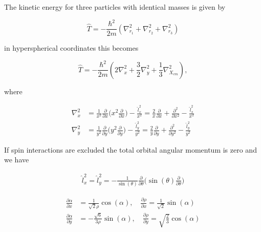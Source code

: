 \documentclass{article}
\begin{document}
The kinetic energy for three particles with identical masses is given by

\begin{equation}
\hat{T} = -\frac{\hbar^2}{2m}( \nabla^{2}_{r_1} + \nabla^{2}_{r_2} + \nabla^{2}_{r_3} )
\end{equation}

in hyperspherical coordinates this becomes 

\begin{equation}
\hat{T} = -\frac{\hbar^2}{2m}( 2\nabla^{2}_{x} + \frac{3}{2}\nabla^{2}_{y} + \frac{1}{3}\nabla^{2}_{X_{cm}} ),
\end{equation}

where

\begin{subequations}
\begin{align}
	\nabla^2_{x} &= \frac{1}{x^2}\frac{\partial}{\partial x} \Big( x^2 \frac{\partial}{\partial x} \Big) - \frac{\hat{l}^2_{x}}{x^2} = \frac{2}{x}\frac{\partial}{\partial x} + \frac{\partial^2}{\partial x^{2}} - \frac{\hat{l}^{2}_{x}}{x^2}\\
	\nabla^2_{y} &= \frac{1}{y^2}\frac{\partial}{\partial y} \Big( y^2 \frac{\partial}{\partial y} \Big) - \frac{\hat{l}^2_{y}}{y^2} = \frac{2}{y}\frac{\partial}{\partial y} + \frac{\partial^2}{\partial y^{2}} - \frac{\hat{l}^{2}_{y}}{y^2}
\end{align}
\end{subequations}

If spin interactions are excluded the total orbital angular momentum is zero and we have 

\begin{subequations}
\begin{align}
\hat{l}^{2}_{x} = \hat{l}^{2}_{y} = -\frac{1}{\sin(\theta)} \frac{\partial}{\partial{\theta}} \Big( \sin(\theta) \frac{\partial}{\partial{\theta}} \Big)
\end{align}
\end{subequations}



\begin{subequations}
\begin{align*}
        \frac{\partial \alpha}{\partial x} &= \frac{1}{\sqrt{2} \rho} \cos(\alpha), \quad \frac{\partial \rho}{\partial x} = \frac{1}{\sqrt{2}} \sin(\alpha) \\
        \frac{\partial \alpha}{\partial y} &= -\frac{\sqrt{6}}{3 \rho} \sin(\alpha), \quad \frac{\partial \rho}{\partial y} = \sqrt{\frac{2}{3}} \cos(\alpha)
\end{align*}
\end{subequations}
\end{document}
